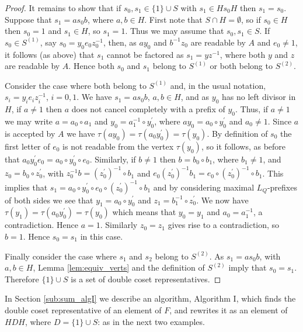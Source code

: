 \documentclass[a4paper,12pt]{article}
\renewcommand{\t}{\tau }
\numberwithin{equation}{section}
\numberwithin{figure}{section}
\begin{document}
\begin{proof}
It remains to show that if $s_0,s_1\in \{1\}\cup S$ with $s_1\in Hs_0H$
then $s_1=s_0$. Suppose that $s_1=as_0b$, where $a, b\in H$.
First note that $S\cap H=\emptyset$, so if $s_0\in H$ then $s_0=1$ and 
$s_1\in H$, so $s_1=1$. 
 Thus we may assume that $s_0,s_1\in S$. 
 If
$s_0\in S^{(1)}$, say $s_0=y_0e_0z_0^{-1}$, then, as $ay_0$ and
$b^{-1}z_0$ are readable by $A$ and $e_0\neq 1$, it follows (as
above) that $s_1$ cannot be factored as $s_1=yz^{-1}$, where both
$y$ and $z$ are readable by $A$. Hence both $s_0$ and $s_1$ belong
to $S^{(1)}$ or both belong to $S^{(2)}$.

Consider the case where both belong to $S^{(1)}$ and, in the usual notation,
$s_i=y_i e_i z_i^{-1}$, $i=0,1$. We have $s_1=as_0b$, $a,b\in H$, and as $y_0$ has
no left divisor in $H$, if $a\neq 1$ then $a$ does not cancel completely with
 a prefix of $y_0$. Thus, if $a\neq 1$ we may write $a=a_0\circ a_1$ and
$y_0=a_1^{-1}\circ y_0^\prime$, where $ay_0=a_0\circ y_0^\prime$
and $a_0\neq 1$. Since
$a$ is accepted by $A$ we have $\t(ay_0)=\t(a_0y_0^\prime)=\t(y_0)$. By definition
of $s_0$ the first letter of $e_0$ is not readable from the vertex $\t(y_0)$, so
it follows, as before that $a_0y_0^\prime e_0=a_0\circ y_0^\prime \circ e_0$. 
Similarly,
if $b\neq 1$ then $b=b_0\circ b_1$, where $b_1\neq 1$,  and $z_0=b_0\circ z_0^\prime$, with
$z_0^{-1}b= (z_0^\prime)^{-1}\circ b_1$ and $e_0 (z_0^\prime)^{-1}b_1=
e_0\circ  (z_0^\prime)^{-1}\circ b_1$. This implies that
$s_1=a_0\circ y_0^\prime \circ  e_0\circ  (z_0^\prime)^{-1}\circ b_1$ and by considering
maximal $L_Q$-prefixes of both sides we see that $y_1=a_0\circ y_0^\prime$ and
$z_1=b_1^{-1}\circ z_0^\prime$. We now have  $\t(y_1)=\t(a_0y_0^\prime)=\t(y_0)$ which
 means that
$y_0=y_1$ and $a_0=a_1^{-1}$,  a contradiction. Hence $a=1$.
Similarly $z_0=z_1$ gives rise to  a contradiction, so $b=1$.
Hence $s_0=s_1$ in this case.

Finally consider the case where $s_1$ and $s_2$ belong to
$S^{(2)}$. As $s_1=as_0b$, with $a,b\in H$, Lemma
\ref{lem:equiv_verts} and the definition of $S^{(2)}$ imply  that
$s_0= s_1$. Therefore $\{1\}\cup S$ is a set of double coset
representatives.
\end{proof}
In Section \ref{sub:sum_algI} we describe an algorithm, Algorithm I,  
which finds the double coset representative of an element of $F$, and 
rewrites it as an element of $HDH$, 
where $D=\{1\}\cup S$: as in the next two examples. 
\end{document}
